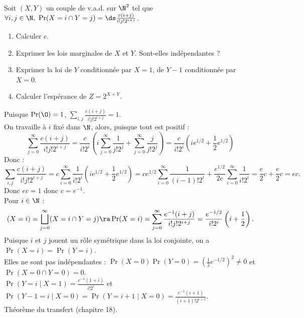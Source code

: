 \documentclass[11pt]{article}
\begin{document}
\begin{exercice}{}{}
    Soit $(X,Y)$ un couple de v.a.d. sur $\N^2$ tel que $\forall i,j \in \N, ~ \Pr(X=i\cap Y=j)=\ds\frac{c(i+j)}{i!j!2^{i+j}}$.
    \begin{enumerate}
        \item Calculer $c$.
        \item Exprimer les lois marginales de $X$ et $Y$. Sont-elles indépendantes ?
        \item Exprimer la loi de $Y$ conditionnée par $X=1$, de $Y-1$ conditionnée par $X=0$.
        \item Calculer l'espérance de $Z=2^{X+Y}$.
    \end{enumerate}
    \tcblower
     Puisque $\Pr(\O) = 1$, $\sum_{i,j}\frac{c(i+j)}{i!j!2^{i+j}}=1$.\\
    On travaille à $i$ fixé dans $\N$, alors, puisque tout est positif :
    \begin{equation*}
        \sum_{j=0}^{\infty}\frac{c(i+j)}{i!j!2^{i+j}} = \frac{c}{i!2^i}\left( i\sum_{j=0}^\infty \frac{1}{j!2^j} + \sum_{j=0}^{\infty}\frac{j}{j!2^j} \right) = \frac{c}{i!2^i}\left( ie^{1/2} + \frac{1}{2}e^{1/2} \right)
    \end{equation*}
    Donc :
    \begin{equation*}
        \sum_{i,j}\frac{c(i+j)}{i!j!2^{i+j}} = c\sum_{i=0}^\infty\frac{1}{i!2^i}\left( ie^{1/2} + \frac{1}{2}e^{1/2}  \right) = ce^{1/2}\sum_{i=0}^\infty\frac{1}{(i-1)!2^i} + \frac{e^{1/2}}{2c}\sum_{i=0}^{\infty}\frac{1}{i!2^{i}}=\frac{e}{2}c+\frac{e}{2}c=ec.
    \end{equation*}
    Donc $ec=1$ donc $c=e^{-1}$.\\
     Pour $i\in\N$ :
    \begin{equation*}
        (X=i) = \bigsqcup_{j=0}^\infty(X=i\cap Y=j) \ra \Pr(X=i) = \sum_{j=0}^\infty\frac{e^{-1}(i+j)}{i!j!2^{i+j}} = \frac{e^{-1/2}}{i!2^i}\left( i+\frac{1}{2} \right).
    \end{equation*}
    Puisque $i$ et $j$ jouent un rôle symétrique dans la loi conjointe, on a $\Pr(X=i)=\Pr(Y=i)$.\\
    Elles ne sont pas indépendantes : $\Pr(X=0)\Pr(Y=0)=(\frac{1}{2}e^{-1/2})^2\neq0$ et $\Pr(X=0\cap Y=0)=0$.\\
     $\Pr(Y=i\mid X=1)=\frac{e^{-1}(1+i)}{i!2^i}$ et $\Pr(Y-1=i \mid X=0) = \Pr(Y=i+1 \mid X=0) = \frac{e^{-1}(i+1)}{(i+1)!2^{i+1}}$.\\
     Théorème du transfert (chapitre 18).
\end{exercice}
\end{document}
